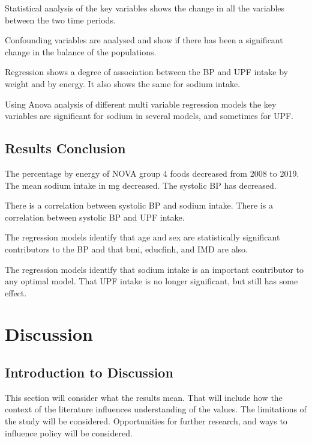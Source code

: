 \documentclass[
]{article}
\begin{document}
Statistical analysis of the key variables shows the change in all the
variables between the two time periods.

Confounding variables are analysed and show if there has been a
significant change in the balance of the populations.

Regression shows a degree of association between the BP and UPF intake
by weight and by energy. It also shows the same for sodium intake.

Using Anova analysis of different multi variable regression models the
key variables are significant for sodium in several models, and
sometimes for UPF.

\hypertarget{results-conclusion}{%
\subsection{Results Conclusion}\label{results-conclusion}}

The percentage by energy of NOVA group 4 foods decreased from 2008 to
2019. The mean sodium intake in mg decreased. The systolic BP has
decreased.

There is a correlation between systolic BP and sodium intake. There is a
correlation between systolic BP and UPF intake.

The regression models identify that age and sex are statistically
significant contributors to the BP and that bmi, educfinh, and IMD are
also.

The regression models identify that sodium intake is an important
contributor to any optimal model. That UPF intake is no longer
significant, but still has some effect. \newpage

\hypertarget{discussion}{%
\section{Discussion}\label{discussion}}

\hypertarget{introduction-to-discussion}{%
\subsection{Introduction to
Discussion}\label{introduction-to-discussion}}

This section will consider what the results mean. That will include how
the context of the literature influences understanding of the values.
The limitations of the study will be considered. Opportunities for
further research, and ways to influence policy will be considered.
\end{document}
